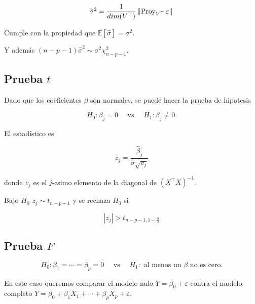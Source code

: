\documentclass[
  12pt,
]{book}
\theoremstyle{definition}
\theoremstyle{definition}
\theoremstyle{definition}
\theoremstyle{remark}
\begin{document}
\begin{equation*}
\hat{\sigma}^{2} 
= \frac{1}{dim(V^{\top})}\left\Vert \operatorname{Proy}_{V^{\top}}\varepsilon\right\Vert \\
\end{equation*}

Cumple con la propiedad que \(\mathbb{E}\left[\hat{\sigma}^{}\right] = \sigma^{2}\).

Y además \((n-p-1)\hat{\sigma}^{2} \sim \sigma^{2} \chi^{2}_{n-p-1}.\)

\hypertarget{prueba-t}{%
\subsection{\texorpdfstring{Prueba \(t\)}{Prueba t}}\label{prueba-t}}

Dado que los coeficientes \(\beta\) son normales, se puede hacer la prueba de hipotesis

\begin{equation*}
 H_{0}: \beta_{j} = 0 \quad \text{ vs } \quad H_{1}:\beta_{j}\neq 0.
 \end{equation*}

El estadístico es

\begin{equation*}
 z_{j} = \frac{\hat{\beta}_{j}}{\hat{\sigma} \sqrt{v_{j}}} 
 \end{equation*}

donde \(v_{j}\) es el \(j\)-esimo elemento de la diagonal de \((X^{\top}X)^{-1}\).

Bajo \(H_{0}\) \(z_{j} \sim t_{n-p-1}\) y se rechaza \(H_{0}\) si

\begin{equation*}
 \left\vert z_{j} \right\vert > t_{n-p-1, 1-\frac{\alpha}{2}} 
 \end{equation*}

\hypertarget{prueba-f}{%
\subsection{\texorpdfstring{Prueba \(F\)}{Prueba F}}\label{prueba-f}}

\begin{equation*}
 H_{0}: \beta_{1} = \cdots =\beta_{p} = 0 \quad 
 \text{  vs   }\quad H_{1}: \text{ al menos un \(\beta\) no es cero}.
 \end{equation*}

En este caso queremos comparar el modelo nulo \(Y=\beta_{0}+\varepsilon\) contra el modelo completo \(Y=\beta_{0}+ \beta_{1}X_{1} + \cdots + \beta_{p}X_{p} + \varepsilon\).
\end{document}
